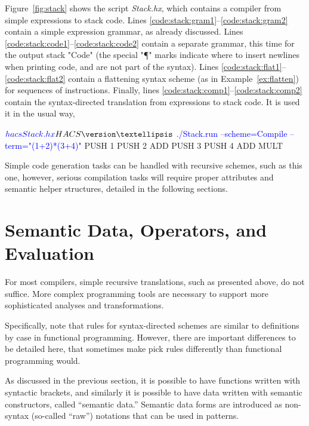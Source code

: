 \documentclass[12pt]{article} %
\begin{document}
\begin{example}\label{ex:stack}
  Figure~\ref{fig:stack} shows the \HAX script \emph{Stack.hx}, which contains a compiler from
  simple expressions to stack code. Lines \ref{code:stack:gram1}--\ref{code:stack:gram2} contain a
  simple expression grammar, as already discussed. Lines
  \ref{code:stack:code1}--\ref{code:stack:code2} contain a separate grammar, this time for the
  output stack "Code" (the special "¶" marks indicate where to insert newlines when printing code,
  and are not part of the syntax). Lines \ref{code:stack:flat1}--\ref{code:stack:flat2} contain a
  flattening syntax scheme (as in Example~\ref{ex:flatten}) for sequences of instructions.  Finally,
  lines \ref{code:stack:comp1}--\ref{code:stack:comp2} contain the syntax-directed translation from
  expressions to stack code. It is used it in the usual way,
  \begin{code}[commandchars=\\\{\}]
$ \textcolor{blue}{hacs Stack.hx}
HACS \version
…
$ \textcolor{blue}{./Stack.run --scheme=Compile --term="(1+2)*(3+4)"}
  PUSH 1 
  PUSH 2 
  ADD 
  PUSH 3 
  PUSH 4 
  ADD 
  MULT 
  \end{code}
  Simple code generation tasks can be handled with recursive schemes, such as this one, however,
  serious compilation tasks will require proper attributes and semantic helper structures, detailed
  in the following sections.
\end{example}


\section{Semantic Data, Operators, and Evaluation}
\label{sec:eval}

For most compilers, simple recursive translations, such as presented above, do not suffice. More
complex programming tools are necessary to support more sophisticated analyses and transformations.

Specifically, note that rules for syntax-directed schemes are similar to definitions by case in
functional programming. However, there are important differences to be detailed here, that sometimes
make \HAX pick rules differently than functional programming would.

As discussed in the previous section, it is possible to have functions written with syntactic
brackets, and similarly it is possible to have data written with semantic constructors, called
``semantic data.''  Semantic data forms are introduced as non-syntax (so-called ``raw'') notations
that can be used in patterns.
\end{document}
